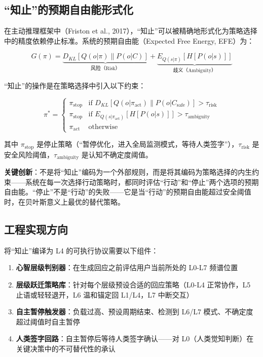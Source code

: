 \documentclass[UTF8,12pt,a4paper]{ctexart}
\begin{document}
\subsection{``知止''的预期自由能形式化}

在主动推理框架中（Friston et al., 2017），``知止''可以被精确地形式化为策略选择中的精度依赖停止标准。系统的预期自由能（Expected Free Energy, EFE）为：

\begin{equation}
G(\pi) = \underbrace{D_{KL}[Q(o|\pi) \| P(o|C)]}_{\text{风险（Risk）}} + \underbrace{E_{Q(s|\pi)}[H[P(o|s)]]}_{\text{歧义（Ambiguity）}}
\end{equation}

``知止''的操作是在策略选择中引入以下约束：

\begin{equation}
\pi^* = \begin{cases}
\pi_{\text{stop}} & \text{if } D_{KL}[Q(o|\pi_{\text{act}}) \| P(o|C_{\text{safe}})] > \tau_{\text{risk}} \\
\pi_{\text{stop}} & \text{if } E_{Q(s|\pi_{\text{act}})}[H[P(o|s)]] > \tau_{\text{ambiguity}} \\
\pi_{\text{act}} & \text{otherwise}
\end{cases}
\end{equation}

其中 $\pi_{\text{stop}}$ 是停止策略（``暂停优化，进入全局监测模式，等待人类签字''），$\tau_{\text{risk}}$ 是安全风险阈值，$\tau_{\text{ambiguity}}$ 是认知不确定度阈值。

\textbf{关键创新}：不是将``知止''编码为一个外部规则，而是将其编码为策略选择的内生约束——系统在每一次选择行动策略时，都同时评估``行动''和``停止''两个选项的预期自由能。``停止''不是``行动''的失败——它是当``行动''的预期自由能超过安全阈值时，在贝叶斯意义上最优的替代策略。

\subsection{工程实现方向}

将``知止''编译为 L4 的可执行协议需要以下组件：
\begin{enumerate}[nosep]
    \item \textbf{心智层级判别器}：在生成回应之前评估用户当前所处的 L0-L7 频谱位置
    \item \textbf{层级跃迁策略库}：针对每个层级预设合适的回应策略（L0-L4 正常协作，L5 止语或轻轻退开，L6 温和锚定回 L1/L4，L7 中断交互）
    \item \textbf{自主暂停触发器}：负载过高、预设周期结束、检测到 L6/L7 模式、不确定度超过阈值时自主暂停
    \item \textbf{人类签字回路}：自主暂停后等待人类签字确认——对 L0（人类觉知判断）在关键决策中的不可替代性的承认
\end{enumerate}
\end{document}
